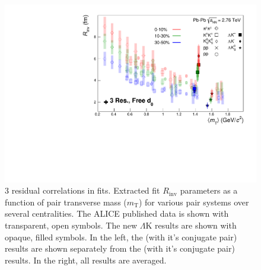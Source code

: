 \documentclass[../AnalysisNoteJBuxton.tex]{subfiles}
\begin{document}
\pagestyle{plain}


\begin{figure}[h]
  \centering
  \includegraphics[width=\textwidth]{7_ResultsAndDiscussion/Figures/mTscaling_MinvCalc_OutlinedPoints_OthersTransparent_3Res_FreeD0.pdf}
  \caption[$m_{\mathrm{T}}$ Scaling of Radii: 3 Residuals in Fit]{3 residual correlations in \LamK fits.  Extracted fit $R_{\mathrm{inv}}$ parameters as a function of pair transverse mass ($m_{\mathrm{T}}$) for various pair systems over several centralities. The ALICE published data \cite{Adam:2015vja} is shown with transparent, open symbols.  The new $\Lambda$K results are shown with opaque, filled symbols.  In the left, the \LamKchP (with it's conjugate pair) results are shown separately from the \LamKchM (with it's conjugate pair) results.  In the right, all \LamKpm results are averaged.}
  \label{fig:mTScalingOfRadii_3Res}
\end{figure}

\clearpage
\end{document}

